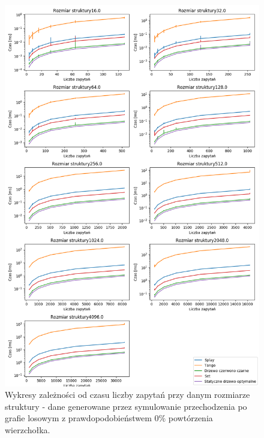 \documentclass[declaration,shortabstract]{iithesis}
\theoremstyle{thm}
\theoremstyle{remark}
\theoremstyle{plain}
\theoremstyle{plain}
\theoremstyle{plain}
\begin{document}
\begin{figure}[H]  
\centering
    \includegraphics[scale=0.5]{wykresy/randwalk100.png}
      \caption{Wykresy zależności od czasu liczby zapytań przy danym rozmiarze struktury - dane generowane przez symulowanie przechodzenia po grafie losowym z prawdopodobieństwem  \(0\%\) powtórzenia wierzchołka. }  
    \label{fig:zigzig} 
\end{figure}
\end{document}
